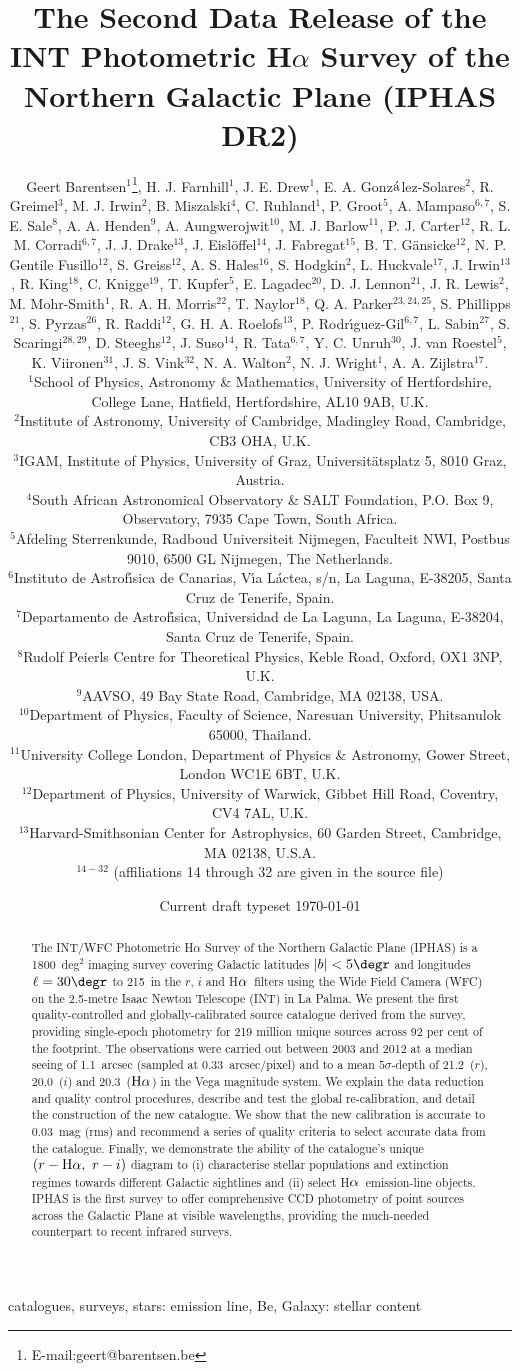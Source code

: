 \documentclass[a4paper,useAMS,usenatbib]{mn2e}
\title[IPHAS Data Release 2]{The Second Data Release 
of the INT Photometric H$\alpha$ Survey 
of the Northern Galactic Plane (IPHAS DR2)}
\author[G. Barentsen
et. al]{Geert Barentsen$^{1}$\thanks{E-mail:geert@barentsen.be},
H. J. Farnhill$^1$,
J. E. Drew$^1$,
E. A. Gonz$\acute{\rm{a}}$lez-Solares$^2$, \newauthor
R. Greimel$^3$, 
M. J. Irwin$^2$,
B. Miszalski$^{4}$,
C. Ruhland$^1$,
P. Groot$^5$,
A. Mampaso$^{6,7}$, \newauthor
S. E. Sale$^8$, 
A. A. Henden$^9$,
A. Aungwerojwit$^{10}$,
M. J. Barlow$^{11}$,
P. J. Carter$^{12}$, \newauthor
R. L. M. Corradi$^{6,7}$, 
J. J. Drake$^{13}$, 
J. Eisl\"offel$^{14}$, 
J. Fabregat$^{15}$, 
B. T. G\"ansicke$^{12}$, \newauthor
N. P. Gentile Fusillo$^{12}$, 
S. Greiss$^{12}$, 
A. S. Hales$^{16}$, 
S. Hodgkin$^2$,
L. Huckvale$^{17}$, \newauthor
J. Irwin$^{13}$,
R. King$^{18}$,
C. Knigge$^{19}$, 
T. Kupfer$^{5}$,
E. Lagadec$^{20}$,
D. J. Lennon$^{21}$, \newauthor
J. R. Lewis$^{2}$,
M. Mohr-Smith$^{1}$,
R. A. H. Morris$^{22}$, 
T. Naylor$^{18}$, 
Q. A. Parker$^{23,24,25}$,  \newauthor
S. Phillipps$^{21}$, 
S. Pyrzas$^{26}$,
R. Raddi$^{12}$,
G. H. A. Roelofs$^{13}$, 
P. Rodr\'\i guez-Gil$^{6,7}$, \newauthor
L. Sabin$^{27}$, 
S. Scaringi$^{28,29}$,
D. Steeghs$^{12}$,
J. Suso$^{14}$,
R. Tata$^{6,7}$,
Y. C. Unruh$^{30}$, \newauthor
J. van Roestel$^5$, 
K. Viironen$^{31}$, 
J. S. Vink$^{32}$, 
N. A. Walton$^{2}$, 
N. J. Wright$^{1}$, \newauthor
A. A. Zijlstra$^{17}$.
\\
$^{1}$School of Physics, Astronomy \& Mathematics, University of Hertfordshire, College Lane, Hatfield, Hertfordshire, AL10 9AB, U.K.\\
$^{2}$Institute of Astronomy, University of Cambridge, Madingley Road, Cambridge, CB3 OHA, U.K.\\
$^{3}$IGAM, Institute of Physics, University of Graz, Universit\"atsplatz 5, 8010 Graz, Austria.\\
$^{4}$South African Astronomical Observatory \& SALT Foundation, P.O. Box 9, Observatory, 7935 Cape Town, South Africa.\\
$^{5}$Afdeling Sterrenkunde, Radboud Universiteit Nijmegen, Faculteit NWI, Postbus 9010, 6500 GL Nijmegen, The Netherlands.\\
$^{6}$Instituto de Astrof\'\i sica de Canarias, V\'\i a L\'actea, s/n, La Laguna, E-38205, Santa Cruz de Tenerife, Spain.\\
$^{7}$Departamento de Astrof\'\i sica, Universidad de La Laguna, La Laguna, E-38204, Santa Cruz de Tenerife, Spain.\\
$^{8}$Rudolf Peierls Centre for Theoretical Physics, Keble Road, Oxford, OX1 3NP, U.K.\\
$^{9}$AAVSO, 49 Bay State Road, Cambridge, MA 02138, USA.\\
$^{10}$Department of Physics, Faculty of Science, Naresuan University, Phitsanulok 65000, Thailand.\\
$^{11}$University College London, Department of Physics \& Astronomy, 
Gower Street, London WC1E 6BT, U.K.\\
$^{12}$Department of Physics, University of Warwick, Gibbet Hill Road, Coventry, CV4 7AL, U.K.\\
$^{13}$Harvard-Smithsonian Center for Astrophysics, 60 Garden Street, 
Cambridge, MA 02138, U.S.A. \\
$^{14-32}$ (affiliations 14 through 32 are given in the source file)
}
\def\ha{\mbox{H$\rm \alpha$}}
\begin{document}
\date{Current draft typeset \today}
\pagerange{\pageref{firstpage}--\pageref{lastpage}} 
\maketitle

\label{firstpage}

\begin{abstract}
The INT/WFC Photometric H$\alpha$ Survey 
of the Northern Galactic Plane (IPHAS)
is a 1800~deg$^2$ imaging survey
covering Galactic latitudes $|b| < 5\degr$
and longitudes $\ell=30\degr$ to 215\degr\ 
in the $r$, $i$ and \ha\ filters 
using the Wide Field Camera (WFC) 
on the 2.5-metre Isaac Newton Telescope (INT) in La Palma.
We present the first quality-controlled and
globally-calibrated source catalogue
derived from the survey,
providing single-epoch photometry
for 219 million unique sources
across 92 per cent of the footprint.
The observations were carried out between 2003 and 2012
at a median seeing of 1.1~arcsec (sampled at 0.33~arcsec/pixel)
and to a mean $5\sigma$-depth of 
21.2~($r$), 20.0~($i$) and 20.3~($\ha$)
in the Vega magnitude system.
We explain the data reduction 
and quality control procedures,
describe and test the global re-calibration,
and detail the construction of the new catalogue.
We show that the new calibration is accurate to
0.03~mag (rms) 
and recommend a series of quality criteria
to select accurate data
from the catalogue.
Finally, we demonstrate the ability of the 
catalogue's unique
$(r-\ha,\ r-i)$ diagram to
(i) characterise stellar populations and extinction regimes
towards different Galactic sightlines
and (ii) select \ha\ emission-line objects.
IPHAS is the first survey to offer comprehensive CCD photometry
of point sources across the Galactic Plane at visible wavelengths,
providing the much-needed counterpart
to recent infrared surveys.
\end{abstract}

\begin{keywords}
catalogues, surveys, stars: emission line, Be, Galaxy: stellar content
\end{keywords}
\end{document}
